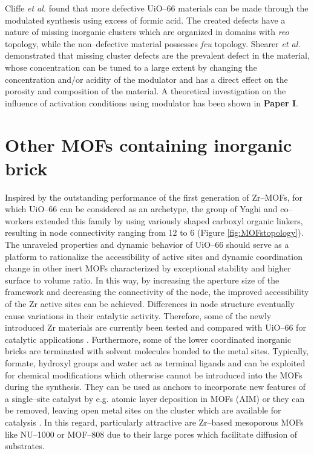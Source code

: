\newpage
Cliffe \textit{et al.}\cite{Cliffe2014} found that more defective UiO--66
materials can be made through the modulated synthesis using excess of formic
acid. The created defects have a nature of missing inorganic clusters which are
organized in domains with \textit{reo} topology, while the non--defective
material possesses \textit{fcu} topology.
Shearer \textit{et al.}\cite{Shearer2016} demonstrated that missing
cluster defects are the prevalent defect in the material, whose 
concentration can be tuned to a large extent by changing the
concentration and/or acidity of the modulator and has a direct effect on the
porosity and composition of the material. A theoretical
investigation on the influence of activation conditions using modulator has been shown in \textbf {Paper I}.


\section{Other MOFs containing  inorganic brick}
Inspired by the outstanding performance of the first generation of
Zr--MOFs, for which UiO--66 can be considered as an archetype, the
group of Yaghi and co--workers extended this family by using variously shaped
carboxyl organic linkers, resulting in  node connectivity ranging from
12 to 6 (Figure \ref{fig:MOFstopology})\cite{Furukawa2014, Liu2017}. The unraveled properties and dynamic behavior of UiO--66 should serve as a platform to rationalize the 
accessibility of active sites and dynamic coordination change in other
inert MOFs characterized by exceptional stability and higher surface to volume
ratio. In this way, by increasing the aperture size of the framework and
decreasing the connectivity of the node, the improved accessibility of the Zr
active sites can be achieved.
Differences in node structure eventually cause variations in their catalytic
activity. Therefore, some of the newly introduced Zr materials are currently
been tested and compared with UiO--66 for catalytic applications
\cite{Lammert2017, Pengfei2017, Pahls2017}. Furthermore, some of the lower
coordinated inorganic bricks are terminated with solvent molecules bonded to the metal sites.
Typically, formate, hydroxyl groups and water act as terminal ligands and can be exploited for chemical modifications which 
otherwise cannot be introduced into the MOFs during the synthesis. 
They can be used as anchors to incorporate new features of a single--site
catalyst by e.g. atomic layer deposition in MOFs (AIM) \cite{Mondloch2013} or
they can be removed, leaving open metal sites on the cluster which are available
for catalysis \cite{Rogge2017}. In this regard, particularly attractive are
Zr--based mesoporous MOFs like NU--1000 \cite{Mondloch2013} or MOF--808
\cite{Moon2015} due to their large pores which facilitate diffusion of
substrates.

